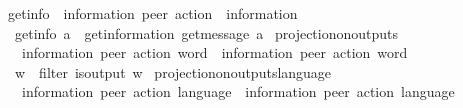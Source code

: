 \begin{isabellebody}
\isanewline
{}\isamarkupfalse%
\ get{\isacharunderscore}{\kern0pt}info\ {\isacharcolon}{\kern0pt}{\isacharcolon}{\kern0pt}\ {\isachardoublequoteopen}{\isacharparenleft}{\kern0pt}{\isacharprime}{\kern0pt}information{\isacharcomma}{\kern0pt}\ {\isacharprime}{\kern0pt}peer{\isacharparenright}{\kern0pt}\ action\ {\isasymRightarrow}\ {\isacharprime}{\kern0pt}information{\isachardoublequoteclose}\ \isanewline
\ \ {\isachardoublequoteopen}get{\isacharunderscore}{\kern0pt}info\ a\ {\isasymequiv}\ get{\isacharunderscore}{\kern0pt}information\ {\isacharparenleft}{\kern0pt}get{\isacharunderscore}{\kern0pt}message\ a{\isacharparenright}{\kern0pt}{\isachardoublequoteclose}\isanewline
\isanewline
{}\isamarkupfalse%
\ projection{\isacharunderscore}{\kern0pt}on{\isacharunderscore}{\kern0pt}outputs\isanewline
\ \ {\isacharcolon}{\kern0pt}{\isacharcolon}{\kern0pt}\ {\isachardoublequoteopen}{\isacharparenleft}{\kern0pt}{\isacharprime}{\kern0pt}information{\isacharcomma}{\kern0pt}\ {\isacharprime}{\kern0pt}peer{\isacharparenright}{\kern0pt}\ action\ word\ {\isasymRightarrow}\ {\isacharparenleft}{\kern0pt}{\isacharprime}{\kern0pt}information{\isacharcomma}{\kern0pt}\ {\isacharprime}{\kern0pt}peer{\isacharparenright}{\kern0pt}\ action\ word{\isachardoublequoteclose}\ \ {\isacharparenleft}{\kern0pt}{\isachardoublequoteopen}{\isacharunderscore}{\kern0pt}{\isasymdown}\isactrlsub {\isacharbang}{\kern0pt}{\isachardoublequoteclose}\ {\isacharbrackleft}{\kern0pt}{}{}{\isacharbrackright}{\kern0pt}\ {}{}{}{\isacharparenright}{\kern0pt}\isanewline
\ \ \isanewline
\ \ {\isachardoublequoteopen}w{\isasymdown}\isactrlsub {\isacharbang}{\kern0pt}\ {\isasymequiv}\ filter\ is{\isacharunderscore}{\kern0pt}output\ w{\isachardoublequoteclose}\isanewline
\isanewline
{}\isamarkupfalse%
\ projection{\isacharunderscore}{\kern0pt}on{\isacharunderscore}{\kern0pt}outputs{\isacharunderscore}{\kern0pt}language\isanewline
\ \ {\isacharcolon}{\kern0pt}{\isacharcolon}{\kern0pt}\ {\isachardoublequoteopen}{\isacharparenleft}{\kern0pt}{\isacharprime}{\kern0pt}information{\isacharcomma}{\kern0pt}\ {\isacharprime}{\kern0pt}peer{\isacharparenright}{\kern0pt}\ action\ language\ {\isasymRightarrow}\ {\isacharparenleft}{\kern0pt}{\isacharprime}{\kern0pt}information{\isacharcomma}{\kern0pt}\ {\isacharprime}{\kern0pt}peer{\isacharparenright}{\kern0pt}\ action\ language{\isachardoublequoteclose}\isanewline
\ \ \ \ \ {\isacharparenleft}{\kern0pt}{\isachardoublequoteopen}{\isacharunderscore}{\kern0pt}{\isasymdownharpoonright}\isactrlsub {\isacharbang}{\kern0pt}{\isachardoublequoteclose}\ {\isacharbrackleft}{\kern0pt}{}{}{}{\isacharbrackright}{\kern0pt}\ {}{}{}{\isacharparenright}{\kern0pt}\isanewline

\end{isabellebody}

